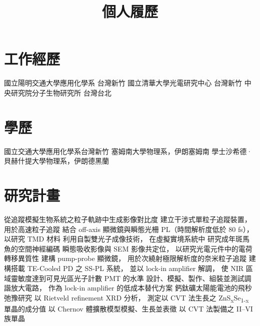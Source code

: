 \documentclass[11pt,a4paper]{moderncv}
\title{個人履歷}
\begin{document}
\makecvtitle
\vspace{-1.0cm}
\section{工作經歷}
        {國立陽明交通大學應用化學系}
        {台灣新竹}{}{}
        {國立清華大學光電研究中心}
        {台灣新竹}{}{}
        {中央研究院分子生物研究所}
        {台灣台北}{}{}
\section{學歷}
        {國立交通大學應用化學系}{台灣新竹}{}{}
        {塞姆南大學物理系，伊朗塞姆南}{}{}{}
        {學士}{沙希德·貝赫什提大學物理系，伊朗德黑蘭}{}{}{}
\section{研究計畫}
        {從追蹤模擬生物系統之粒子軌跡中生成影像對比度}
        {建立干涉式單粒子追蹤裝置，
        用於高速粒子追蹤}
        {結合 off-axis 顯微鏡與瞬態光柵 PL（時間解析度低於 80 fs），
        以研究 TMD 材料}
        {利用自製雙光子成像技術，
        在虛擬實境系統中
        研究成年斑馬魚的空間神經編碼}
        {瞬態吸收影像與 SEM 影像共定位，
        以研究光電元件中的電荷轉移異質性}
        {建構 pump-probe 顯微鏡，
        用於次繞射極限解析度的奈米粒子追蹤}
        {建構搭載 TE-Cooled PD 之 SS-PL 系統，
        並以 lock-in amplifier 解調，
        使 NIR 區域靈敏度達到可見光區光子計數 PMT 的水準}
        {設計、模擬、製作、組裝並測試調諧放大電路，
        作為 lock-in amplifier 的低成本替代方案}
        {鈣鈦礦太陽能電池的飛秒弛豫研究}
        {以 Rietveld refinement XRD 分析，
        測定以 CVT 法生長之
        ZnS\textsubscript{x}Se\textsubscript{1-x} 單晶的成分值}
        {以 Chernov 體擴散模型模擬、生長並表徵
        以 CVT 法製備之
        II--VI 族單晶}
\end{document}
